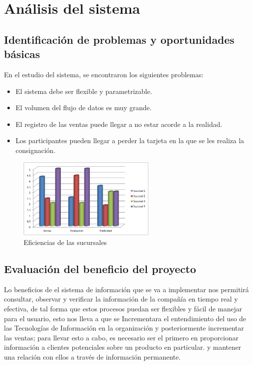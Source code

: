 \chapter{An\'alisis del sistema}
\section{Identificaci\'on de problemas y oportunidades b\'asicas}
En el estudio del sistema, se encontraron los siguientes problemas:%
\\
\begin{itemize}
\item El sistema debe ser flexible y parametrizable.%
\item El volumen del flujo de datos es muy grande.%
\item El registro de las ventas puede llegar a no estar acorde a la realidad.%
\item Los participantes pueden llegar a perder la tarjeta en la que se les realiza la consignaci\'on.%
\end{itemize}%
%
\begin{figure}[htbp]
	\centering
		\includegraphics[width=0.60\textwidth]{images/Eficienciadelasucursal.jpg}
	\caption{Eficiencias de las sucursales}
	\label{fig:eficienciasucursales}
\end{figure}%
%
\section{Evaluaci\'on del beneficio del proyecto}
Lo beneficios de el sistema de informaci\'on que se va a implementar nos permitir\'a consultar, observar y verificar la informaci\'on de la compa\~n\'ia en tiempo real y efectiva, de tal forma que estos procesos puedan ser flexibles y f\'acil de manejar para el usuario, esto nos lleva a que se Incrementara  el entendimiento del uso de las Tecnolog\'ias de Informaci\'on en la organizaci\'on y posteriormente  incrementar las ventas; para llevar esto a cabo, es necesario ser el primero en proporcionar informaci\'on a clientes potenciales sobre un producto en particular. y mantener una relaci\'on con ellos a trav\'es de informaci\'on permanente.%
%
